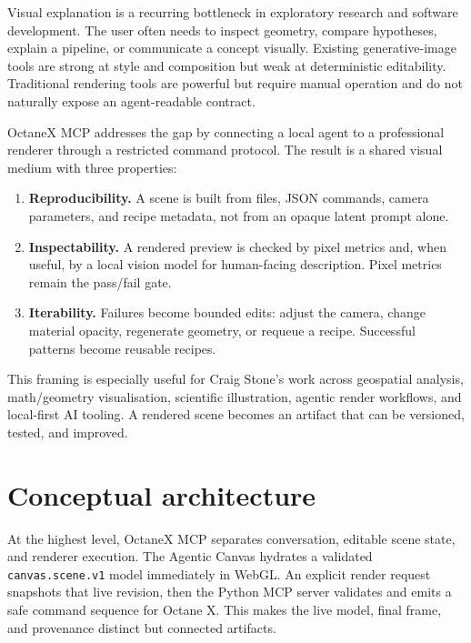 \documentclass[11pt,a4paper]{article}
\newcommand{\project}{OctaneX MCP}
\begin{document}
Visual explanation is a recurring bottleneck in exploratory research and software development. The user often needs to inspect geometry, compare hypotheses, explain a pipeline, or communicate a concept visually. Existing generative-image tools are strong at style and composition but weak at deterministic editability. Traditional rendering tools are powerful but require manual operation and do not naturally expose an agent-readable contract.

\project{} addresses the gap by connecting a local agent to a professional renderer through a restricted command protocol. The result is a shared visual medium with three properties:

\begin{enumerate}[leftmargin=*]
  \item \textbf{Reproducibility.} A scene is built from files, JSON commands, camera parameters, and recipe metadata, not from an opaque latent prompt alone.
  \item \textbf{Inspectability.} A rendered preview is checked by pixel metrics and, when useful, by a local vision model for human-facing description. Pixel metrics remain the pass/fail gate.
  \item \textbf{Iterability.} Failures become bounded edits: adjust the camera, change material opacity, regenerate geometry, or requeue a recipe. Successful patterns become reusable recipes.
\end{enumerate}

This framing is especially useful for Craig Stone's work across geospatial analysis, math/geometry visualisation, scientific illustration, agentic render workflows, and local-first AI tooling. A rendered scene becomes an artifact that can be versioned, tested, and improved.

\section{Conceptual architecture}

At the highest level, \project{} separates conversation, editable scene state, and renderer execution. The Agentic Canvas hydrates a validated \texttt{canvas.scene.v1} model immediately in WebGL. An explicit render request snapshots that live revision, then the Python MCP server validates and emits a safe command sequence for Octane X. This makes the live model, final frame, and provenance distinct but connected artifacts.
\end{document}
